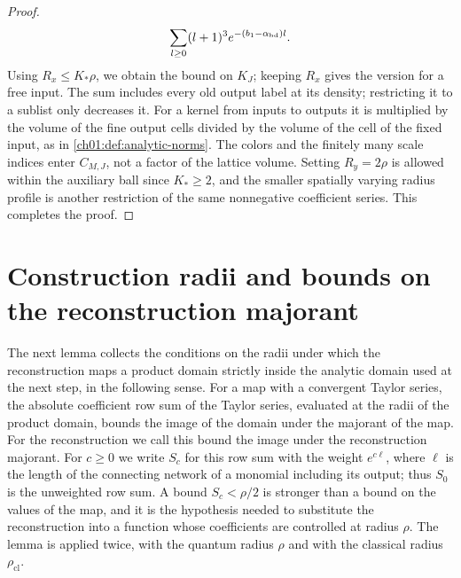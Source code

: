 \begin{proof}
\begin{align*}
        \sum_{l\ge0}(l+1)^3e^{-(b_1-\alpha_{\mathrm{bd}})l}.
\end{align*}
Using $R_x\le K_*\rho$, we obtain the bound on $K_J$; keeping $R_x$ gives the version for a free input. The sum includes every old output label at its density; restricting it to a sublist only decreases it. For a kernel from inputs to outputs it is multiplied by the volume of the fine output cells divided by the volume of the cell of the fixed input, as in \cref{ch01:def:analytic-norms}. The colors and the finitely many scale indices enter $C_{M,J}$, not a factor of the lattice volume. Setting $R_y=2\rho$ is allowed within the auxiliary ball since $K_*\ge2$, and the smaller spatially varying radius profile is another restriction of the same nonnegative coefficient series. This completes the proof.
\end{proof}

\section{Construction radii and bounds on the reconstruction majorant}\label{ch16:sec:images}

The next lemma collects the conditions on the radii under which the reconstruction maps a product domain strictly inside the analytic domain used at the next step, in the following sense. For a map with a convergent Taylor series, the absolute coefficient row sum of the Taylor series, evaluated at the radii of the product domain, bounds the image of the domain under the majorant of the map. For the reconstruction we call this bound the image under the reconstruction majorant. For $c\ge0$ we write $S_c$ for this row sum with the weight $e^{c\ell}$, where $\ell$ is the length of the connecting network of a monomial including its output; thus $S_0$ is the unweighted row sum. A bound $S_c<\rho/2$ is stronger than a bound on the values of the map, and it is the hypothesis needed to substitute the reconstruction into a function whose coefficients are controlled at radius $\rho$. The lemma is applied twice, with the quantum radius $\rho$ and with the classical radius $\rho_{\mathrm{cl}}$.

